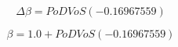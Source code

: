 \begin{equation}
    \Delta \beta = PoD VoS \left(-0.16967559\right)
\end{equation}

\begin{equation}
    \beta = 1.0 + PoD VoS \left(-0.16967559\right)
\end{equation}
